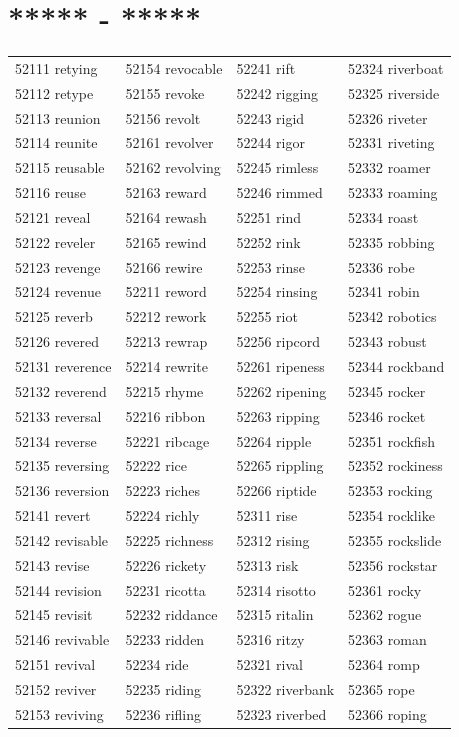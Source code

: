 \documentclass[10pt, oneside]{book}
\begin{document}
\begin{table}[h]
	\centering
	\section*{***** - *****}
	\begin{tabular}{l l l l}
52111 retying &52154 revocable &52241 rift &52324 riverboat\\
52112 retype &52155 revoke &52242 rigging &52325 riverside\\
52113 reunion &52156 revolt &52243 rigid &52326 riveter\\
52114 reunite &52161 revolver &52244 rigor &52331 riveting\\
52115 reusable &52162 revolving &52245 rimless &52332 roamer\\
52116 reuse &52163 reward &52246 rimmed &52333 roaming\\
52121 reveal &52164 rewash &52251 rind &52334 roast\\
52122 reveler &52165 rewind &52252 rink &52335 robbing\\
52123 revenge &52166 rewire &52253 rinse &52336 robe\\
52124 revenue &52211 reword &52254 rinsing &52341 robin\\
52125 reverb &52212 rework &52255 riot &52342 robotics\\
52126 revered &52213 rewrap &52256 ripcord &52343 robust\\
52131 reverence &52214 rewrite &52261 ripeness &52344 rockband\\
52132 reverend &52215 rhyme &52262 ripening &52345 rocker\\
52133 reversal &52216 ribbon &52263 ripping &52346 rocket\\
52134 reverse &52221 ribcage &52264 ripple &52351 rockfish\\
52135 reversing &52222 rice &52265 rippling &52352 rockiness\\
52136 reversion &52223 riches &52266 riptide &52353 rocking\\
52141 revert &52224 richly &52311 rise &52354 rocklike\\
52142 revisable &52225 richness &52312 rising &52355 rockslide\\
52143 revise &52226 rickety &52313 risk &52356 rockstar\\
52144 revision &52231 ricotta &52314 risotto &52361 rocky\\
52145 revisit &52232 riddance &52315 ritalin &52362 rogue\\
52146 revivable &52233 ridden &52316 ritzy &52363 roman\\
52151 revival &52234 ride &52321 rival &52364 romp\\
52152 reviver &52235 riding &52322 riverbank &52365 rope\\
52153 reviving &52236 rifling &52323 riverbed &52366 roping\\
	\end{tabular}
 \end{table}
\end{document}
